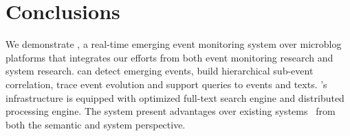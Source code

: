 
\section{Conclusions}
We demonstrate \ring, a real-time emerging event monitoring system over microblog platforms
that integrates our efforts from both event monitoring research and system research.
\ring can detect emerging events, build hierarchical sub-event correlation, trace event evolution and support queries to events and texts.
\ring's infrastructure is equipped with optimized full-text search engine and distributed processing engine.
The system present advantages over existing systems~\cite{xie2014clear, schubert2014signitrend, mathioudakis2010twittermonitor} from both the semantic and system perspective.








\balance
